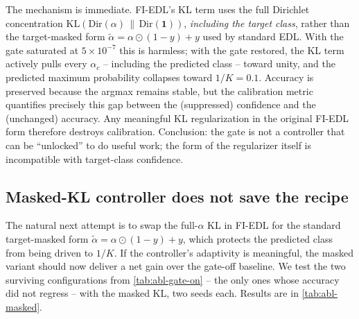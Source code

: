 \documentclass[review,5p,times]{elsarticle}
\begin{document}
The mechanism is immediate. FI-EDL's KL term uses the full Dirichlet
concentration $\mathrm{KL}(\mathrm{Dir}(\alpha)\,\|\,\mathrm{Dir}(\mathbf{1}))$,
\emph{including the target class}, rather than the target-masked form
$\tilde\alpha\!=\!\alpha\odot(1-y)+y$ used by standard EDL. With the gate
saturated at $5\!\times\!10^{-7}$ this is harmless; with the gate restored,
the KL term actively pulls every $\alpha_c$ -- including the predicted
class -- toward unity, and the predicted maximum probability collapses
toward $1/K\!=\!0.1$. Accuracy is preserved because the argmax remains
stable, but the calibration metric quantifies precisely this gap between
the (suppressed) confidence and the (unchanged) accuracy. Any meaningful
KL regularization in the original FI-EDL form therefore destroys
calibration. Conclusion: the gate is not a controller that can be
``unlocked'' to do useful work; the form of the regularizer itself is
incompatible with target-class confidence.

\subsection{Masked-KL controller does not save the
recipe}\label{sec:abl-masked}

The natural next attempt is to swap the full-$\alpha$ KL in FI-EDL for the
standard target-masked form $\tilde\alpha\!=\!\alpha\odot(1-y)+y$, which
protects the predicted class from being driven to $1/K$. If the
controller's adaptivity is meaningful, the masked variant should now
deliver a net gain over the gate-off baseline. We test the two surviving
configurations from \autoref{tab:abl-gate-on} -- the only ones whose
accuracy did not regress -- with the masked KL, two seeds each. Results
are in \autoref{tab:abl-masked}.
\end{document}
